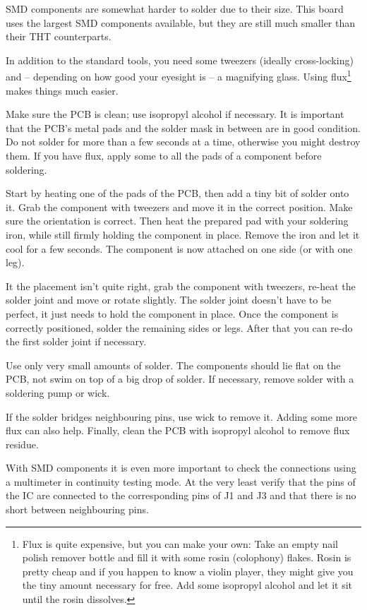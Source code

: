 \documentclass{article}
\begin{document}
SMD components are somewhat harder to solder due to their size. This board uses the largest SMD components available, but they are still much smaller than their THT counterparts. 

In addition to the standard tools, you need some tweezers (ideally cross-locking) and -- depending on how good your eyesight is -- a magnifying glass. Using flux\footnote{Flux is quite expensive, but you can make your own: Take an empty nail polish remover bottle and fill it with some rosin (colophony) flakes. Rosin is pretty cheap and if you happen to know a violin player, they might give you the tiny amount necessary for free. Add some isopropyl alcohol and let it sit until the rosin dissolves.} makes things much easier. 

Make sure the PCB is clean; use isopropyl alcohol if necessary. It is important that the PCB's metal pads and the solder mask in between are in good condition. Do not solder for more than a few seconds at a time, otherwise you might destroy them. If you have flux, apply some to all the pads of a component before soldering. 

Start by heating one of the pads of the PCB, then add a tiny bit of solder onto it. Grab the component with tweezers and move it in the correct position. Make sure the orientation is correct. Then heat the prepared pad with your soldering iron, while still firmly holding the component in place. Remove the iron and let it cool for a few seconds. The component is now attached on one side (or with one leg). 

It the placement isn't quite right, grab the component with tweezers, re-heat the solder joint and move or rotate slightly. The solder joint doesn't have to be perfect, it just needs to hold the component in place. Once the component is correctly positioned, solder the remaining sides or legs. After that you can re-do the first solder joint if necessary. 

Use only very small amounts of solder. The components should lie flat on the PCB, not swim on top of a big drop of solder. If necessary, remove solder with a soldering pump or wick. 

If the solder bridges neighbouring pins, use wick to remove it. Adding some more flux can also help. 
Finally, clean the PCB with isopropyl alcohol to remove flux residue. 

With SMD components it is even more important to check the connections using a multimeter in continuity testing mode. At the very least verify that the pins of the IC are connected to the corresponding pins of J1 and J3 and that there is no short between neighbouring pins. 
\end{document}
